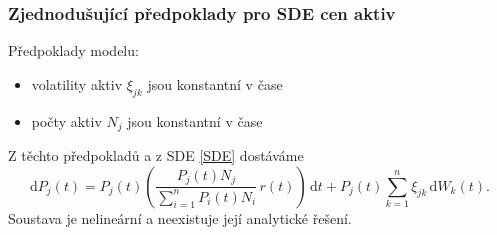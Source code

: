 \documentclass[xcolor=dvipsnames]{beamer}
\theoremstyle{definition} \newtheorem{definice}[veta]{Definice}
\theoremstyle{remark}
\begin{document}
\begin{frame}
  \frametitle{Zjednodušující předpoklady pro SDE cen aktiv}
 \textcolor{OliveGreen}{Předpoklady modelu:}
  \begin{itemize}
   \item volatility aktiv $\xi_{jk}$ jsou konstantní v čase
   \item počty aktiv $N_j$ jsou konstantní v čase
  \end{itemize}    \vspace{1cm}
  Z těchto předpokladů a z SDE \eqref{SDE} dostáváme
\begin{equation} 
 \mathrm{d}P_j(t)=P_j(t)\left(\frac{P_j(t)N_j}{\sum_{i=1}^n P_i(t)N_i}\, r(t)\right)\,\mathrm{d}t+P_j(t)\sum_{k=1}^{n}\xi_{jk}\,\mathrm{d}W_k(t).
\end{equation}  
Soustava je nelineární a neexistuje její analytické řešení.
\end{frame}
\end{document}
